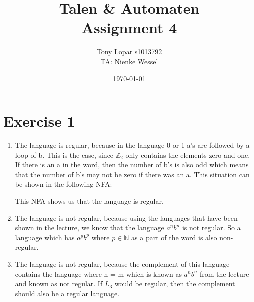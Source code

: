 \documentclass{article}
\begin{document}
\title{Talen \& Automaten \\ Assignment 4}
\date{\today}
\author{Tony Lopar \enspace s1013792 \\TA: Nienke Wessel}
\maketitle

\section*{Exercise 1}
\begin{enumerate}[label= \alph*)]
  \item The language is regular, because in the language 0 or 1 a's are followed by a loop of b. This is the case, since $\mathbb{Z}_2$ only contains the elements zero and one. If there is an a in the word, then the number of b's is also odd which means that the number of b's may not be zero if there was an a. This situation can be shown in the following NFA:
  \begin{center}
  \end{center}
  This NFA shows us that the language is regular.
  \item The language is not regular, because using the languages that have been shown in the lecture, we know that the language $a^nb^n$ is not regular. So a language which has $a^p b^p$ where $p \in \mathbb{N}$ as a part of the word is also non-regular.
  \item The language is not regular, because the complement of this language contains the language where n = m which is known as $a^n b^n$ from the lecture and known as not regular. If $L_3$ would be regular, then the complement should also be a regular language.
\end{enumerate}
\end{document}
